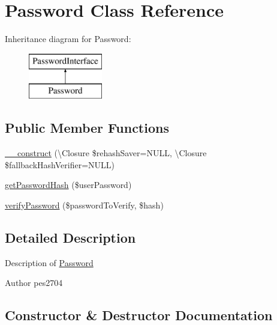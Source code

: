 \hypertarget{class_pes_1_1_security_1_1_password_1_1_password}{}\section{Password Class Reference}
\label{class_pes_1_1_security_1_1_password_1_1_password}
Inheritance diagram for Password\+:\begin{figure}[H]
\begin{center}
\leavevmode
\includegraphics[height=2.000000cm]{class_pes_1_1_security_1_1_password_1_1_password}
\end{center}
\end{figure}
\subsection*{Public Member Functions}
\begin{DoxyCompactItemize}
\item 
\mbox{\hyperlink{class_pes_1_1_security_1_1_password_1_1_password_a5b04d795731c8230975d6f2b68500505}{\+\_\+\+\_\+construct}} (\textbackslash{}Closure \$rehash\+Saver=N\+U\+LL, \textbackslash{}Closure \$fallback\+Hash\+Verifier=N\+U\+LL)
\item 
\mbox{\hyperlink{class_pes_1_1_security_1_1_password_1_1_password_ace90dad06accc8133e50dd863df4b91e}{get\+Password\+Hash}} (\$user\+Password)
\item 
\mbox{\hyperlink{class_pes_1_1_security_1_1_password_1_1_password_a66a5774f5734e6d66c32c500bf9ea335}{verify\+Password}} (\$password\+To\+Verify, \$hash)
\end{DoxyCompactItemize}


\subsection{Detailed Description}
Description of \mbox{\hyperlink{class_pes_1_1_security_1_1_password_1_1_password}{Password}}

\begin{DoxyAuthor}{Author}
pes2704 
\end{DoxyAuthor}


\subsection{Constructor \& Destructor Documentation}
\mbox{\label{class_pes_1_1_security_1_1_password_1_1_password_a5b04d795731c8230975d6f2b68500505}} 
